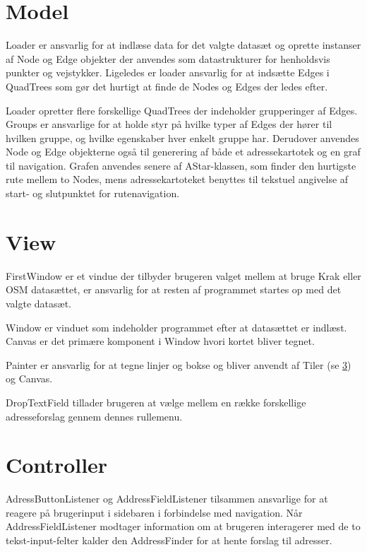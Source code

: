\section{Model}
\label{sec:model}

Loader er ansvarlig for at indlæse data for det valgte datasæt og oprette instanser af Node og Edge objekter der anvendes som datastrukturer for henholdsvis punkter og vejstykker. Ligeledes er loader ansvarlig for at indsætte Edges i QuadTrees som gør det hurtigt at finde de Nodes og Edges der ledes efter.

Loader opretter flere forskellige QuadTrees der indeholder grupperinger af Edges. Groups er ansvarlige for at holde styr på hvilke typer af Edges der hører til hvilken gruppe, og hvilke egenskaber hver enkelt gruppe har. Derudover anvendes Node og Edge objekterne også til generering af både et adressekartotek og en graf til navigation. Grafen anvendes senere af AStar-klassen, som finder den hurtigste rute mellem to Nodes, mens adressekartoteket benyttes til tekstuel angivelse af start- og slutpunktet for rutenavigation.

\section{View}
\label{sec:view}

FirstWindow er et vindue der tilbyder brugeren valget mellem at bruge Krak eller OSM datasættet, er ansvarlig for at resten af programmet startes op med det valgte datasæt.

Window er vinduet som indeholder programmet efter at datasættet er indlæst. Canvas er det primære komponent i Window hvori kortet bliver tegnet.

Painter er ansvarlig for at tegne linjer og bokse og bliver anvendt af Tiler (se \ref{sec:controller}) og Canvas.

DropTextField tillader brugeren at vælge mellem en række forskellige adresseforslag gennem dennes rullemenu.

\section{Controller}
\label{sec:controller}

AdressButtonListener og AddressFieldListener tilsammen ansvarlige for at reagere på brugerinput i sidebaren i forbindelse med navigation. Når AddressFieldListener modtager information om at brugeren interagerer med de to tekst-input-felter kalder den AddressFinder for at hente forslag til adresser.

